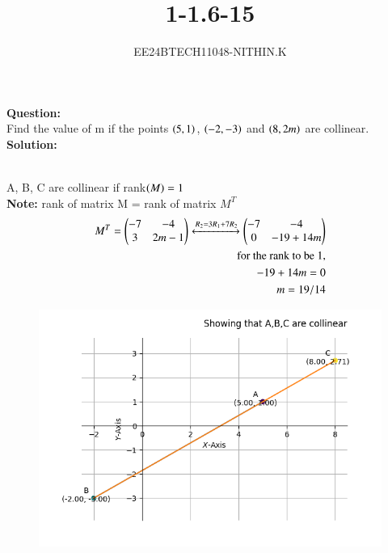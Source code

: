 \documentclass[journal]{IEEEtran}
\numberwithin{equation}{enumi}
\numberwithin{figure}{enumi}
\begin{document}


\title{1-1.6-15}
\author{EE24BTECH11048-NITHIN.K}
{\let\newpage\relax\maketitle}

\textbf{Question:} \\
Find the value of m if the points $\left(5, 1\right)$, $\left(-2, -3\right)$ and $\left(8, 2m\right)$ are collinear. \\
\textbf{Solution:} \\
\begin{table}[h!]    
      \centering
      
      \caption{}
\end{table} \\
A, B, C are collinear if rank$\left(M\right) = 1$ \\
\textbf{Note:} rank of matrix M = rank of matrix $M^T$ \\
\begin{align}
	M^T = \begin{pmatrix}
		-7 & -4 \\
		3 & 2m-1\end{pmatrix}
	\xleftrightarrow{\substack{R_2 = 3R_1 + 7R_2}}
	\begin{pmatrix}
		-7 & -4 \\
		0 & -19+14m\end{pmatrix} \\
	\text{for the rank to be 1,} \\
	-19+14m=0 \\
	m=19/14
\end{align}
\begin{figure}[h]
\centering
\includegraphics[width=0.7\linewidth]{figs/Figure_1.png}
\caption{}
\label{graph}
\end{figure}
\end{document}
